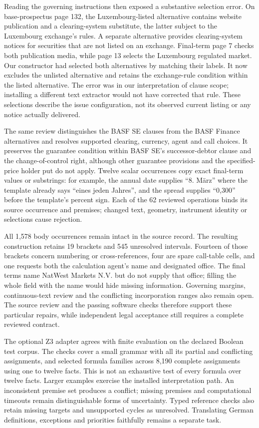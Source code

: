 Reading the governing instructions then exposed a substantive selection error.
On base-prospectus page 132, the Luxembourg-listed alternative contains website
publication and a clearing-system substitute, the latter subject to the
Luxembourg exchange's rules. A separate alternative provides clearing-system
notices for securities that are not listed on an exchange. Final-term page 7
checks both publication media, while page 13 selects the Luxembourg regulated
market. Our constructor had selected both alternatives by matching their labels.
It now excludes the unlisted alternative and retains the exchange-rule condition
within the listed alternative. The error was in our interpretation of clause
scope; installing a different text extractor would not have corrected that rule.
These selections describe the issue configuration, not its observed current
listing or any notice actually delivered.

The same review distinguishes the BASF SE clauses from the BASF Finance
alternatives and resolves supported clearing, currency, agent and call choices.
It preserves the guarantee condition within BASF SE's successor-debtor clause
and the change-of-control right, although other guarantee provisions and the
specified-price holder put do not apply. Twelve scalar occurrences copy exact
final-term values or substrings: for example, the annual date supplies
``8. März'' where the template already says ``eines jeden Jahres'', and the
spread supplies ``0,300'' before the template's percent sign. Each of the 62
reviewed operations binds its source occurrence and premises; changed text,
geometry, instrument identity or selections cause rejection.

All 1,578 body occurrences remain intact in the source record. The resulting
construction retains 19 brackets and 545 unresolved intervals. Fourteen of those
brackets concern numbering or cross-references, four are spare call-table cells,
and one requests both the calculation agent's name and designated office. The
final terms name NatWest Markets N.V. but do not supply that office; filling
the whole field with the name would hide missing information. Governing margins,
continuous-text review and the conflicting incorporation ranges also remain
open. The source review and the passing software checks therefore support these
particular repairs, while independent legal acceptance still requires a complete
reviewed contract.

\begingroup
{}
The optional Z3 adapter agrees with finite evaluation on the declared Boolean
test corpus. The checks cover a small grammar with all its partial and conflicting
assignments, and selected formula families across 8,190 complete assignments
using one to twelve facts. This is not an exhaustive test of every formula over
twelve facts. Larger examples exercise the installed interpretation path. An
inconsistent premise set produces a conflict; missing premises and computational
timeouts remain distinguishable forms of uncertainty. Typed reference checks
also retain missing targets and unsupported cycles as unresolved. Translating
German definitions, exceptions and priorities faithfully remains a separate task.
\par\endgroup

